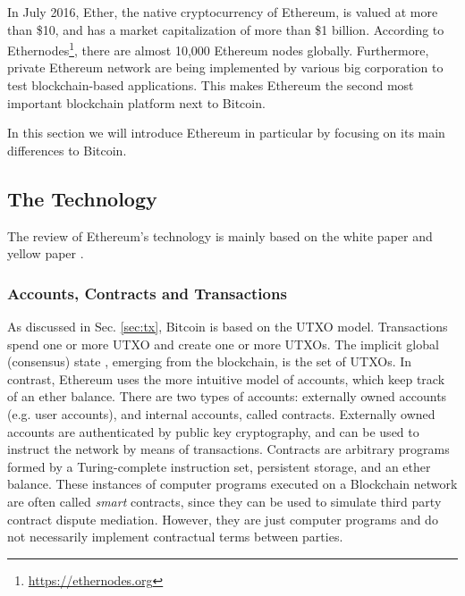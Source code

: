 In July 2016, Ether, the native cryptocurrency of Ethereum, is valued at more than \$10, and has a market capitalization of more than \$1 billion. According to Ethernodes\footnote{\url{https://ethernodes.org}}, there are almost 10,000 Ethereum nodes globally. Furthermore, private Ethereum network are being implemented by various big corporation to test blockchain-based applications. This makes Ethereum the second most important blockchain platform next to Bitcoin.

In this section we will introduce Ethereum in particular by focusing on its main differences to Bitcoin. 

\subsection{The Technology}
\label{sec:ethereum:tech}

The review of Ethereum's technology is mainly based on the white paper \parencite{ethereumWhite} and yellow paper \parencite{wood2014ethereum}. 

\subsubsection{Accounts, Contracts and Transactions}
\label{sec:ethereum:tech:tx}
As discussed in Sec. \ref{sec:tx}, Bitcoin is based on the UTXO model. Transactions spend one or more UTXO and create one or more UTXOs. The implicit global (consensus) state , emerging from the blockchain, is the set of UTXOs. In contrast, Ethereum uses the more intuitive model of accounts, which keep track of an ether balance. There are two types of accounts: externally owned accounts (e.g. user accounts), and internal accounts, called contracts. Externally owned accounts are authenticated by public key cryptography, and can be used to instruct the network by means of transactions. Contracts are arbitrary programs formed by a Turing-complete instruction set, persistent storage, and an ether balance. These instances of computer programs executed on a Blockchain network are often called \emph{smart} contracts, since they can be used to simulate third party contract dispute mediation. However, they are just computer programs and do not necessarily implement contractual terms between parties.

